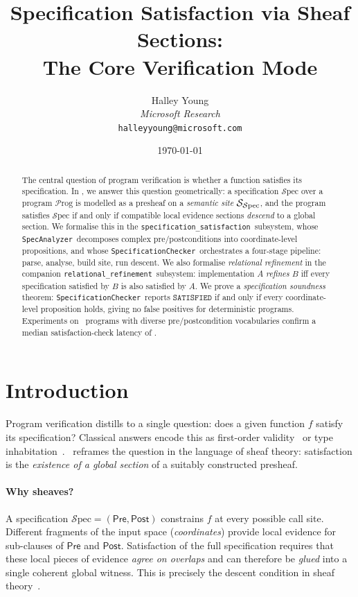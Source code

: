 \documentclass[11pt]{article}
\title{\textbf{Specification Satisfaction via Sheaf Sections:\\
       The Core Verification Mode}}
\author{%
  Halley Young\\
  \textit{Microsoft Research}\\
  \texttt{halleyyoung@microsoft.com}
}
\date{\today}
\newcommand{\Spec}{\mathcal{S}\mathrm{pec}}        %
\newcommand{\Pre}{\ensuremath{\mathsf{Pre}}}                     %
\newcommand{\Post}{\ensuremath{\mathsf{Post}}}                   %
\newcommand{\SAT}{\texttt{SATISFIED}}               %
\newcommand{\Prog}{\mathcal{P}\mathrm{rog}}         %
\newcommand{\SatSite}{{\Site_{\Spec}}}                %
\newcommand{\specpkg}{\texttt{specification\_satisfaction}}
\newcommand{\relpkg}{\texttt{relational\_refinement}}
\newcommand{\SpecificationChecker}{\texttt{SpecificationChecker}}
\newcommand{\SpecAnalyzer}{\texttt{SpecAnalyzer}}
\begin{document}
\maketitle

\begin{abstract}
The central question of program verification is whether a function
satisfies its specification.  In \JuGeo, we answer this question
geometrically: a specification $\Spec$ over a program $\Prog$ is
modelled as a presheaf on a \emph{semantic site} $\SatSite$, and the
program satisfies $\Spec$ if and only if compatible local evidence
sections \emph{descend} to a global section.
We formalise this in the \specpkg\ subsystem, whose
\SpecAnalyzer\ decomposes complex pre/postconditions into
coordinate-level propositions, and whose \SpecificationChecker\
orchestrates a four-stage pipeline: parse, analyse, build site, run
descent.
We also formalise \emph{relational refinement} in the companion
\relpkg\ subsystem: implementation $A$ \emph{refines} $B$ iff every
specification satisfied by $B$ is also satisfied by $A$.
We prove a \emph{specification soundness} theorem: \SpecificationChecker\
reports $\SAT$ if and only if every coordinate-level proposition holds,
giving no false positives for deterministic programs.
Experiments on \numspec\ programs with diverse pre/postcondition
vocabularies confirm a median satisfaction-check latency of \medtime.
\end{abstract}

\newpage

\section{Introduction}\label{sec:intro}

Program verification distills to a single question: does a given
function $f$ satisfy its specification?  Classical answers encode
this as first-order validity~\cite{Floyd1967,Hoare1969} or type
inhabitation~\cite{MartinLof1975}.  \JuGeo\ reframes the question
in the language of sheaf theory: satisfaction is the \emph{existence
of a global section} of a suitably constructed presheaf.

\paragraph{Why sheaves?}
A specification $\Spec = (\Pre, \Post)$ constrains $f$ at every
possible call site.  Different fragments of the input space
(\emph{coordinates}) provide local evidence for sub-clauses of $\Pre$
and $\Post$.  Satisfaction of the full specification requires that
these local pieces of evidence \emph{agree on overlaps} and can
therefore be \emph{glued} into a single coherent global witness.
This is precisely the descent condition in sheaf theory~\cite{SGA4}.
\end{document}
